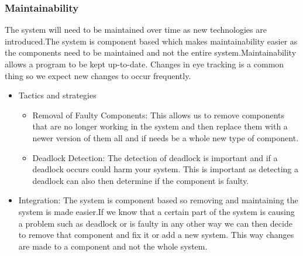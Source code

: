 \subsubsection{Maintainability}
\begin{flushleft}
The system will need to be maintained over time as new technologies are introduced.The system is component based which makes maintainability easier as the components need to be maintained and not the entire system.Maintainability allows a program to be kept up-to-date. Changes in eye tracking is a common thing so we expect new changes to occur frequently.
\begin{itemize}
\item{Tactics and strategies}
\begin{itemize}
\item{Removal of Faulty Components}: This allows us to remove components that are no longer working in the system and then replace them with a newer version of them all and if needs be a whole new type of component.
\item{Deadlock Detection}: The detection of deadlock is important and if a deadlock occurs could harm your system. This is important as detecting a deadlock can also then determine if the component is faulty.
\end{itemize}

\item{Integration}: The system is component based so removing and maintaining the system is made easier.If we know that a certain part of the system is causing a problem such as deadlock or is faulty in any other way we can then  decide to remove that component and fix it or add a new system. This way changes are made to a component and not the whole system.
\end{itemize}

\end{flushleft}
		
